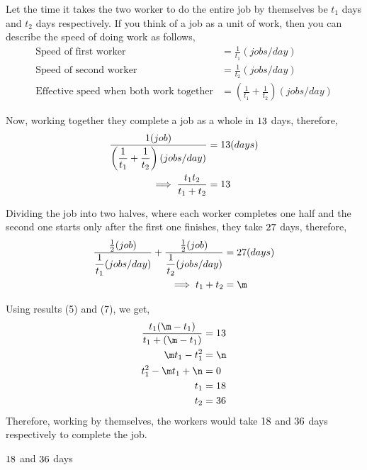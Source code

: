 \begin{solution}[\fullpage]
  Let the time it takes the two worker to do the entire job by themselves be $t_1$ days and $t_2$ days respectively. If you think of a job as a unit of work, then you can describe the speed of doing work as follows,
  \begin{align}
    \text{Speed of first worker}  &= \frac{1}{t_1}(jobs/day) \\
    \text{Speed of second worker} &= \frac{1}{t_2}(jobs/day) \\
    \text{Effective speed when both work together}     
    				  &= \left(\frac{1}{t_1}+\frac{1}{t_2}\right)(jobs/day)
  \end{align}
  
  Now, working together they complete a job as a whole in $13$ days, therefore,
  \begin{align}
	\dfrac{1(job)}
	      {\left(\dfrac{1}{t_1}+\dfrac{1}{t_2}\right)(jobs/day)} &= 13(days) \\
	\implies \dfrac{t_1t_2}{t_1+t_2}                             &=13 
  \end{align}
  
  Dividing the job into two halves, where each worker completes one half and the second one starts only after the first one finishes, they take $27$ days, therefore,
  \begin{align}
    \dfrac{\frac{1}{2}(job)}{\dfrac{1}{t_1}(jobs/day)} +
      \dfrac{\frac{1}{2}(job)}{\dfrac{1}{t_2}(jobs/day)} &= \vb(days) \\
    \implies t_1+t_2                                     &= \m 
  \end{align}
  
  Using results (5) and (7), we get,
  \begin{align}
    \dfrac{t_1(\m-t_1)}{t_1+(\m-t_1)} &= \va \\
    \m t_1-t_1^2                       &= \n \\
    t_1^2-\m t_1+\n                   &= 0 \\     
    t_1                               &= \vc \\
    t_2                               &= \vd 
  \end{align}
  Therefore, working by themselves, the workers would take $18$ and $36$ days respectively to complete the job.

\end{solution}

\ifprintanswers\begin{codex}
  $18$ and $36$ days
\end{codex}\fi
